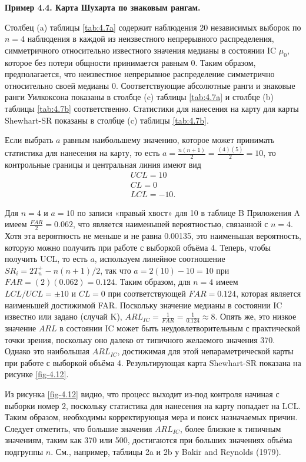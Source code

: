 \noindent\textbf{Пример 4.4. Карта Шухарта по знаковым рангам.}

Столбец (a) таблицы \ref{tab:4.7a} содержит наблюдения 20 независимых выборок по \(n = 4\) наблюдения в каждой из неизвестного непрерывного распределения, симметричного относительно известного значения медианы в состоянии IC \(\mu_0\), которое без потери общности принимается равным 0. Таким образом, предполагается, что неизвестное непрерывное распределение симметрично относительно своей медианы 0. Соответствующие абсолютные ранги и знаковые ранги Уилкоксона показаны в столбце (c) таблицы \ref{tab:4.7a} и столбце (b) таблицы \ref{tab:4.7b} соответственно. Статистики для нанесения на карту для карты Shewhart-SR показаны в столбце (c) таблицы \ref{tab:4.7b}.

Если выбрать \(a\) равным наибольшему значению, которое может принимать статистика для нанесения на карту, то есть \(a = \frac{n(n + 1)}{2} = \frac{(4)(5)}{2} = 10\), то контрольные границы и центральная линия имеют вид
\[
\begin{gathered}
	UCL = 10 \\
	CL = 0 \\
	LCL = -10.
\end{gathered}
\]

Для \(n = 4\) и \(a = 10\) по записи «правый хвост» для 10 в таблице B Приложения A имеем \(\frac{FAR}{2} = 0.062\), что является наименьшей вероятностью, связанной с \(n = 4\). Хотя эта вероятность не меньше и не равна 0.00135, это наименьшая вероятность, которую можно получить при работе с выборкой объёма 4. Теперь, чтобы получить UCL, то есть \(a\), используем линейное соотношение \(SR_i = 2T_n^+ - n(n + 1)/2\), так что \(a = 2(10) - 10 = 10\) при \(FAR = (2)(0.062) = 0.124\). Таким образом, для \(n = 4\) имеем \(LCL/UCL = \pm 10\) и \(CL = 0\) при соответствующей \(FAR = 0.124\), которая является наименьшей достижимой FAR. Поскольку значение медианы в состоянии IC известно или задано (случай K), \(ARL_{IC} = \frac{1}{FAR} = \frac{1}{0.124} \approx 8\). Опять же, это низкое значение \(ARL\) в состоянии IC может быть неудовлетворительным с практической точки зрения, поскольку оно далеко от типичного желаемого значения 370. Однако это наибольшая \(ARL_{IC}\), достижимая для этой непараметрической карты при работе с выборкой объёма 4. Результирующая карта Shewhart-SR показана на рисунке \ref{fig-4.12}.

Из рисунка \ref{fig-4.12} видно, что процесс выходит из-под контроля начиная с выборки номер 2, поскольку статистика для нанесения на карту попадает на LCL. Таким образом, необходимы корректирующая мера и поиск назначаемых причин. Следует отметить, что большие значения \(ARL_{IC}\), более близкие к типичным значениям, таким как 370 или 500, достигаются при больших значениях объёма подгруппы \(n\). См., например, таблицы 2a и 2b у Bakir and Reynolds (1979).

